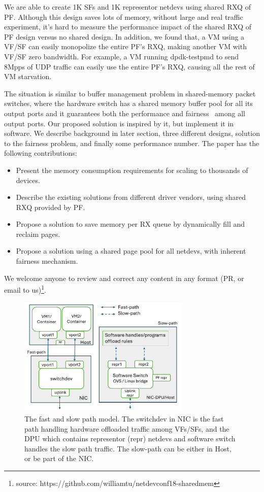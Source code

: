 \documentclass[letterpaper]{article}
\begin{document}
We are able to create 1K SFs and 1K representor netdevs using shared RXQ
of PF. Although this design saves lots of memory, without large and real traffic experiment, it's hard to measure the performance impact of the shared RXQ
of PF design versus no shared design.
In addition, we found that, a VM using a VF/SF can easily monopolize the
entire PF's RXQ, making another VM with VF/SF zero bandwidth.
For example, a VM
running dpdk-testpmd to send 8Mpps of UDP traffic can easily use the
entire PF's RXQ, causing all the rest of VM starvation.

The situation is similar to buffer management problem in shared-memory
packet switches, where the hardware switch has a shared memory buffer pool
for all its output ports and it guarantees both the performance and
fairness~\cite{devlinksb, queuelength} among all output ports.
Our proposed solution is inspired by it, but implement it in software.
We describe background in later section, three different designs,
solution to the fairness problem, and finally some performance
number. The paper has the following contributions:
\begin{itemize}
    \item Present the memory consumption requirements for scaling to
          thousands of devices.
    \item Describe the existing solutions from different driver vendors,
          using shared RXQ provided by PF.
    \item Propose a solution to save memory per RX queue by dynamically
          fill and reclaim pages.
    \item Propose a solution using a shared page pool for all netdevs,
          with inherent fairness mechanism.
\end{itemize}
We welcome anyone to review and correct any content in any format (PR, or email to us)\footnote{source: https://github.com/williamtu/netdevconf18-sharedmem}.

\begin{figure}[t!]
\includegraphics[width=3.2in]{arch.pdf}
\caption{The fast and slow path model. The switchdev in NIC is the fast path handling
hardware offloaded traffic among VFs/SFs, and the DPU which contains representor (repr) netdevs and software switch handles the slow path traffic. The slow-path can be
either in Host, or be part of the NIC.}
\label{fig:arch}
\end{figure}
\end{document}
